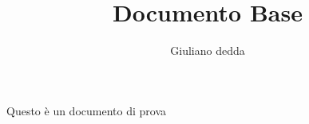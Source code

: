 \documentclass[a4paper]{article}
\title{Documento Base}
\author{Giuliano dedda}
\begin{document}
Questo è un documento di prova
\end{document}
